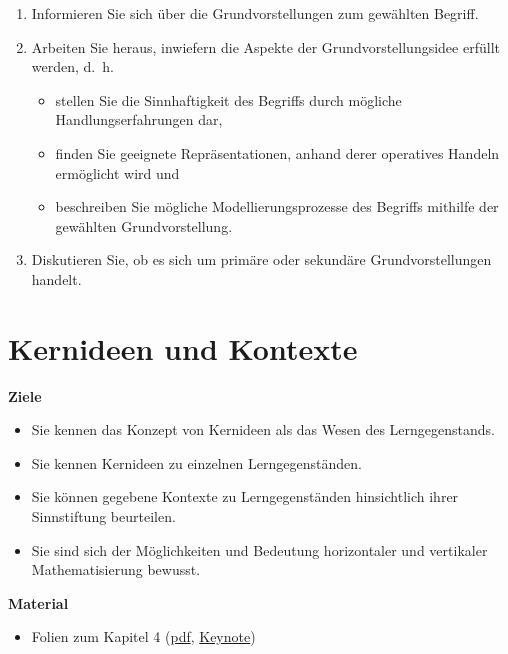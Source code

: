 \documentclass[
]{scrbook}
\providecommand{\tightlist}{%
  \setlength{\itemsep}{0pt}\setlength{\parskip}{0pt}}
\renewenvironment{quote}{
  \list{}{
	\leftmargin0.2cm   %
    \rightmargin\leftmargin
      	\def\FrameCommand
    {%
        {\color{quoteColor}\vrule width 2pt}%
        \hspace{0pt}%
    }%
    \MakeFramed{\advance \hsize -\width \FrameRestore}    \color{quoteColor}
    }
  \item\relax
}
{\endlist\color{black}\endMakeFramed}
\theoremstyle{definition}
\theoremstyle{definition}
\theoremstyle{definition}
\theoremstyle{definition}
\theoremstyle{remark}
\begin{document}
\begin{enumerate}
\def\labelenumi{\arabic{enumi}.}
\tightlist
\item
  Informieren Sie sich über die Grundvorstellungen zum gewählten Begriff.
\item
  Arbeiten Sie heraus, inwiefern die Aspekte der Grundvorstellungsidee erfüllt werden, d.~h.

  \begin{itemize}
  \tightlist
  \item
    stellen Sie die Sinnhaftigkeit des Begriffs durch mögliche Handlungserfahrungen dar,
  \item
    finden Sie geeignete Repräsentationen, anhand derer operatives Handeln ermöglicht wird und
  \item
    beschreiben Sie mögliche Modellierungsprozesse des Begriffs mithilfe der gewählten Grundvorstellung.
  \end{itemize}
\item
  Diskutieren Sie, ob es sich um primäre oder sekundäre Grundvorstellungen handelt.
\end{enumerate}

\chapter{Kernideen und Kontexte}\label{kernideen-und-kontexte}

\begin{quote}
\textbf{Ziele}

\begin{itemize}
\tightlist
\item
  Sie kennen das Konzept von Kernideen als das Wesen des Lerngegenstands.
\item
  Sie kennen Kernideen zu einzelnen Lerngegenständen.
\item
  Sie können gegebene Kontexte zu Lerngegenständen hinsichtlich ihrer Sinnstiftung beurteilen.
\item
  Sie sind sich der Möglichkeiten und Bedeutung horizontaler und vertikaler Mathematisierung bewusst.
\end{itemize}

\textbf{Material}

\begin{itemize}
\tightlist
\item
  Folien zum Kapitel 4 (\href{files/Stoffdidaktik2024-04-KernideenUndKontexte.pdf}{pdf}, \href{files/Stoffdidaktik2024-04-KernideenUndKontexte.key}{Keynote})
\end{itemize}
\end{quote}
\end{document}

